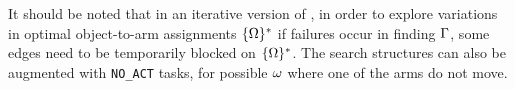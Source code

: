 It should be noted that in an iterative version of \algo, in order to explore variations in optimal object-to-arm assignments $ \{{{\Omega}}\}^* $ if failures occur in finding ${\Gamma}$, some edges need to be temporarily blocked on $ \{{{\Omega}}\}^* $. The search structures can also be augmented with {\tt NO\_ACT} tasks, for possible ${\omega}$ where one of the arms do not move. 

